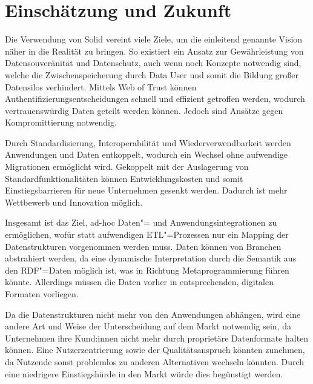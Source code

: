 
\section{Einschätzung und Zukunft}

Die Verwendung von Solid vereint viele Ziele, um die einleitend genannte Vision näher in die Realität zu bringen.
So existiert ein Ansatz zur Gewährleistung von Datensouveränität und Datenschutz, auch wenn noch Konzepte notwendig sind, welche die Zwischenspeicherung durch Data User und somit die Bildung großer Datensilos verhindert.
Mittels Web of Trust können Authentifizierungsentscheidungen schnell und effizient getroffen werden, wodurch vertrauenswürdig Daten geteilt werden können.
Jedoch sind Ansätze gegen Kompromittierung notwendig.

Durch Standardisierung, Interoperabilität und Wiederverwendbarkeit werden Anwendungen und Daten entkoppelt, wodurch ein Wechsel ohne aufwendige Migrationen ermöglicht wird.
Gekoppelt mit der Auslagerung von Standardfunktionalitäten können Entwicklungskosten und somit Einstiegsbarrieren für neue Unternehmen gesenkt werden.
Dadurch ist mehr Wettbewerb und Innovation möglich.

Insgesamt ist das Ziel, ad-hoc Daten"= und Anwendungsintegrationen zu ermöglichen, wofür statt aufwendigen ETL"=Prozessen nur ein Mapping der Datenstrukturen vorgenommen werden muss.
Daten können von Branchen abstrahiert werden, da eine dynamische Interpretation durch die Semantik aus den RDF"=Daten möglich ist, was in Richtung Metaprogrammierung führen könnte.
Allerdings müssen die Daten vorher in entsprechenden, digitalen Formaten vorliegen.

Da die Datenstrukturen nicht mehr von den Anwendungen abhängen, wird eine andere Art und Weise der Unterscheidung auf dem Markt notwendig sein, da Unternehmen ihre Kund:innen nicht mehr durch proprietäre Datenformate halten können.
Eine Nutzerzentrierung sowie der Qualitätsanspruch könnten zunehmen, da Nutzende sonst problemlos zu anderen Alternativen wechseln könnten.
Durch eine niedrigere Einstiegshürde in den Markt würde dies begünstigt werden.
